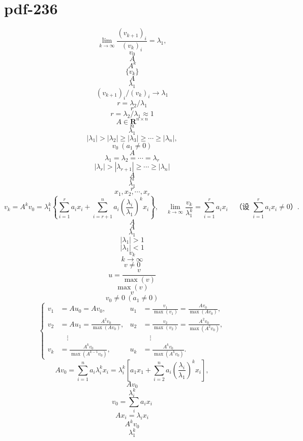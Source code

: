 \documentclass[fontset=fandol]{ctexart}
\begin{document}
\section*{pdf-236}
\[
\lim_{k\to\infty}\frac{(v_{k+1})_i}{(v_k)_i}=\lambda_1,
\tag{9.2.7}
\]
\[
v_0
\]
\[
A
\]
\[
A^k
\]
\[
\{v_k\}
\]
\[
A
\]
\[
\lambda_1
\]
\[
(v_{k+1})_i/(v_k)_i\to\lambda_1
\]
\[
r=\lambda_2/\lambda_1
\]
\[
r
\]
\[
r=\lambda_2/\lambda_1\approx1
\]
\[
A\in\mathbf R^{n\times n}
\]
\[
n
\]
\[
\lambda_1
\]
\[
|\lambda_1|>|\lambda_2|\geq|\lambda_3|\geq\cdots\geq|\lambda_n|,
\]
\[
v_0\ (a_1\ne0)
\]
\[
A
\]
\[
\lambda_1=\lambda_2=\cdots=\lambda_r
\]
\[
|\lambda_r|>|\lambda_{r+1}|\geq\cdots\geq|\lambda_n|
\]
\[
A
\]
\[
n
\]
\[
\lambda_1
\]
\[
r
\]
\[
x_1,x_2,\cdots,x_r
\]
\[
v_k=A^kv_0=\lambda_1^k\left\{\sum_{i=1}^ra_ix_i+\sum_{i=r+1}^na_i\left(\frac{\lambda_i}{\lambda_1}\right)^kx_i\right\},\quad
\lim_{k\to\infty}\frac{v_k}{\lambda_1^k}=\sum_{i=1}^ra_ix_i\quad\text{（设 }\sum_{i=1}^ra_ix_i\ne0\text{）}.
\]
\[
A
\]
\[
A
\]
\[
\lambda_1
\]
\[
|\lambda_1|>1
\]
\[
|\lambda_1|<1
\]
\[
v_k
\]
\[
k\to\infty
\]
\[
v\ne0
\]
\[
u=\dfrac{v}{\max(v)}
\]
\[
\max(v)
\]
\[
v
\]
\[
v_0\ne0\ (a_1\ne0)
\]
\[
\left\{
\begin{aligned}
v_1&=Au_0=Av_0,&u_1&=\frac{v_1}{\max(v_1)}=\frac{Av_0}{\max(Av_0)},\\
v_2&=Au_1=\frac{A^2v_0}{\max(Av_0)},&u_2&=\frac{v_2}{\max(v_2)}=\frac{A^2v_0}{\max(A^2v_0)},\\
&\quad\vdots&&\quad\vdots\\
v_k&=\frac{A^kv_0}{\max(A^{k-1}v_0)},&u_k&=\frac{A^kv_0}{\max(A^kv_0)}.
\end{aligned}
\right.
\]
\[
Av_0=\sum_{i=1}^na_i\lambda_i^kx_i=\lambda_i^k\left[a_1x_1+\sum_{i=2}^na_i\left(\frac{\lambda_i}{\lambda_1}\right)^kx_i\right],
\tag{9.2.8}
\]
\[
Av_0
\]
\[
\lambda_i^k
\]
\[
v_0=\sum_i a_ix_i
\]
\[
Ax_i=\lambda_ix_i
\]
\[
A^kv_0
\]
\[
\lambda_1^k
\]
\end{document}
